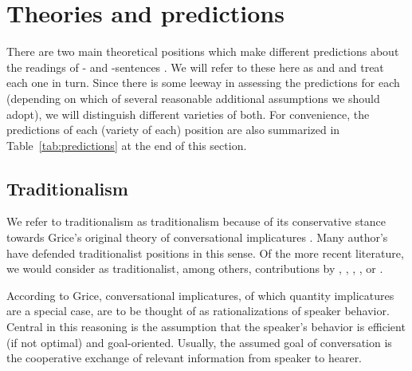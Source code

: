 \documentclass[fleqn,reqno,10pt,draft]{article}
\newcommand{\as}{\acro{as}}
\renewcommand{\es}{\acro{es}}
\begin{document}
\section{Theories and predictions}
\label{sec:theories-predictions}

There are two main theoretical positions which make different
predictions about the readings of \as- and \es-sentences
\citep[c.f.][for
overview]{Horn2006:The-Border-Wars,Geurts2010:Quantity-Implic,Sauerland2012:The-Computation}. We
will refer to these here as  and
 and treat each one in turn. Since there is
some leeway in assessing the predictions for each (depending on which
of several reasonable additional assumptions we should adopt), we will
distinguish different varieties of both. For convenience, the
predictions of each (variety of each) position are also summarized in
Table~\ref{tab:predictions} at the end of this section.

\subsection{Traditionalism}
\label{sec:traditionalism}

We refer to traditionalism as traditionalism because of its
conservative stance towards Grice's original theory of conversational
implicatures \citep{Grice1975:Logic-and-Conve}. Many author's have
defended traditionalist positions in this sense. Of the more recent
literature, we would consider as traditionalist, among others,
contributions by \citet{Spector2006:Scalar-Implicat},
\citet{Sauerland2004:Scalar-Implicat},
\citet{Russell2006:Against-Grammat},
\citet{vanRooijSchulz:ExhaustiveInterpretation},
\citet{Geurts2010:Quantity-Implic} or
\citet{Franke2011:Quantity-Implic}.

According to Grice, conversational implicatures, of which quantity
implicatures are a special case, are to be thought of as
rationalizations of speaker behavior. Central in this reasoning is the
assumption that the speaker's behavior is efficient (if not optimal)
and goal-oriented. Usually, the assumed goal of conversation is the
cooperative exchange of relevant information from speaker to hearer.
\end{document}

